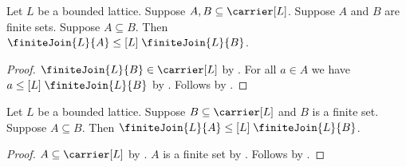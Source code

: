 \begin{proposition}\label{finite_join_monotone}
    Let $L$ be a bounded lattice.
    Suppose $A,B\subseteq\carrier[L]$.
    Suppose $A$ and $B$ are finite sets.
    Suppose $A\subseteq B$.
    Then $\finiteJoin{L}{A}\mathrel{\leq[L]}\finiteJoin{L}{B}$.
\end{proposition}
\begin{proof}
    $\finiteJoin{L}{B}\in\carrier[L]$ by .
    For all $a\in A$ we have
        $a\mathrel{\leq[L]}\finiteJoin{L}{B}$ by
        .
    Follows by .
\end{proof}

\begin{proposition}\label{finite_join_monotone_of_finite_supset}
    Let $L$ be a bounded lattice.
    Suppose $B\subseteq\carrier[L]$ and $B$ is a finite set.
    Suppose $A\subseteq B$.
    Then $\finiteJoin{L}{A}\mathrel{\leq[L]}\finiteJoin{L}{B}$.
\end{proposition}
\begin{proof}
    $A\subseteq\carrier[L]$ by .
    $A$ is a finite set by .
    Follows by .
\end{proof}

